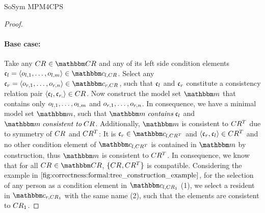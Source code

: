 \begin{copiedFrom}{SoSym MPM4CPS}
\begin{proof}
    \paragraph{Base case:}
    Take any $\consistencyrelation{CR}{} \in \consistencyrelationset{CR}$ and any of its left side condition elements $\conditionelement{c}{l} = \tupled{\object{o}{l,1}, \dots, \object{o}{l,m}} \in \condition{c}{l, \consistencyrelation{CR}{}}$.
    Select any $\conditionelement{c}{r} = \tupled{\object{o}{r,1}, \dots, \object{o}{r,n}} \in \condition{c}{r, \consistencyrelation{CR}{}}$, such that $\mathfrak{c}_{l}$ and $\mathfrak{c}_{r}$ constitute a consistency relation pair $\langle \mathfrak{c}_{l}, \mathfrak{c}_{r,} \rangle \in CR_{}$.
    Now construct the model set $\modelset{m}$ that contains only $o_{l,1}, \dots, o_{l,m}$ and $o_{r,1}, \dots, o_{r,n}$. %
    In consequence, we have a minimal model set $\modelset{m}$, such that $\modelset{m} \containsmath \conditionelement{c}{l}$ and $\modelset{m} \consistenttomath \consistencyrelation{CR}{}$.
    Additionally, $\modelset{m}$ is consistent to $CR^T_{}$ due to symmetry of $CR_{}$ and $CR^T_{}$: It is $\conditionelement{c}{r} \in \condition{c}{l,\consistencyrelation{CR^T}{}}$ and $\langle \mathfrak{c}_{r}, \mathfrak{c}_{l} \rangle \in CR^T_{}$ and no other condition element of $\condition{c}{l,\consistencyrelation{CR^T}{}}$ is contained in $\modelset{m}$ by construction, thus $\modelset{m}$ is consistent to $CR^T_{}$.
    In consequence, we know that for all $\consistencyrelation{CR}{} \in \consistencyrelationset{CR}$, $\{ CR_{}, CR^T_{} \}$ is compatible. 
    Considering the example in $\autoref{fig:correctness:formal:tree_construction_example}$, for the selection of any person as a condition element in $\condition{c}{l,\consistencyrelation{CR}{1}}$ (1), we select a resident in $\condition{c}{r,\consistencyrelation{CR}{1}}$ with the same name (2), such that the elements are consistent to $CR_{1}$.
    

\end{proof}
\end{copiedFrom}
